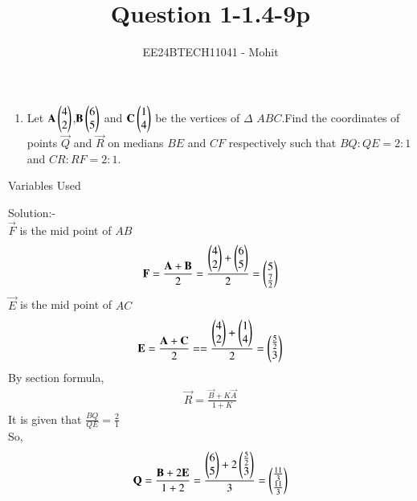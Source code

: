 \documentclass[journal]{IEEEtran}
\numberwithin{equation}{enumi}
\numberwithin{figure}{enumi}
\begin{document}

\title{Question 1-1.4-9p}
\author{EE24BTECH11041 - Mohit}
{\let\newpage\relax\maketitle}
\begin{enumerate}
	\item Let $\mathbf{A}\begin{pmatrix}4\\2\end{pmatrix}$,$\mathbf{B}\begin{pmatrix}6\\5\end{pmatrix}$ and $\mathbf{C}\begin{pmatrix}1\\4\end{pmatrix}$ be the vertices of $\Delta$ $ABC$.Find the coordinates of points $\vec{Q}$ and $\vec{R}$ on medians $BE$ and $CF$ respectively such that $BQ:QE=2:1$ and $CR:RF=2:1$.
\end{enumerate}
\begin{table}[h!]    
  \centering
  
  \caption{Variables Used}
  \label{tab 1.4.9.2}
\end{table}
Solution:-\\
$\vec{F}$ is the mid point of $AB$\\
\begin{align}
	\mathbf{F}=\frac{\mathbf{A}+\mathbf{B}}{2}=\frac{\begin{pmatrix}4\\2\end{pmatrix} + \begin{pmatrix}6\\5\end{pmatrix}}{2}
=\begin{pmatrix}5\\ \frac{7}{2}\end{pmatrix}
\end{align}
$\vec{E}$ is the mid point of $AC$\\
\begin{align}
	\mathbf{E}=\frac{\mathbf{A}+\mathbf{C}}{2}==\frac{\begin{pmatrix}4\\2\end{pmatrix} + \begin{pmatrix}1\\4\end{pmatrix}}{2}
=\begin{pmatrix}\frac{5}{2}\\3\end{pmatrix}
\end{align}
By section formula,
\begin{align}
	\vec{R}=\frac{\vec{B}+K\vec{A}}{1+K}
\end{align}
It is given that $\frac{BQ}{QE}=\frac{2}{1}$\\
So,\\
\begin{align}
	\mathbf{Q}=\frac{\mathbf{B}+2\mathbf{E}}{1+2}=\frac{\begin{pmatrix}6\\5\end{pmatrix} + 2\begin{pmatrix}\frac{5}{2}\\3\end{pmatrix}}{3}=\begin{pmatrix}\frac{11}{3}\\ \frac{11}{3}\end{pmatrix}
\end{align}
\end{document}
